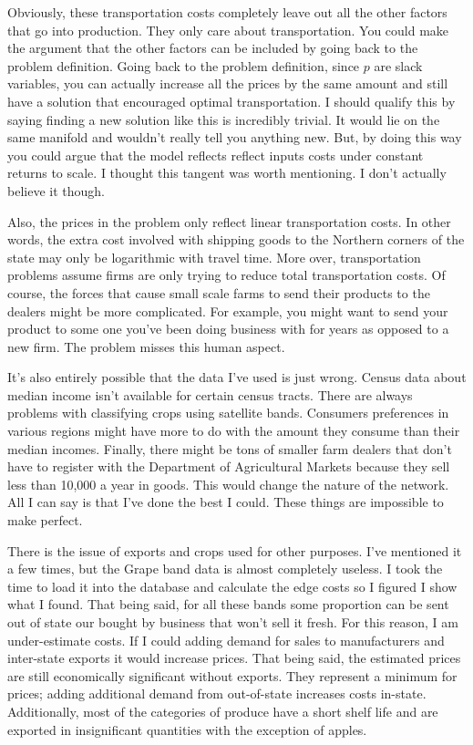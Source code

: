 \documentclass{report}
\begin{document}
Obviously, these transportation costs completely leave out all the other factors that go into production. They only care about transportation. You could make the argument that the other factors can be included by going back to the problem definition. Going back to the problem definition, since $p$ are slack variables, you can actually increase all the prices by the same amount and still have a solution that encouraged optimal transportation. I should qualify this by saying finding a new solution like this is incredibly trivial. It would lie on the same manifold and wouldn't really tell you anything new. But, by doing this way you could argue that the model reflects reflect inputs costs under constant returns to scale. I thought this tangent was worth mentioning. I don't actually believe it though.

Also, the prices in the problem only reflect linear transportation costs. In other words, the extra cost involved with shipping goods to the Northern corners of the state may only be logarithmic with travel time. More over, transportation problems assume firms are only trying to reduce total transportation costs. Of course, the forces that cause small scale farms to send their products to the dealers might be more complicated. For example, you might want to send your product to some one you've been doing business with for years as opposed to a new firm. The problem misses this human aspect.

It's also entirely possible that the data I've used is just wrong. Census data about median income isn't available for certain census tracts. There are always problems with classifying crops using satellite bands. Consumers preferences in various regions might have more to do with the amount they consume than their median incomes. Finally, there might be tons of smaller farm dealers that don't have to register with the Department of Agricultural Markets because they sell less than 10,000 a year in goods. This would change the nature of the network. All I can say is that I've done the best I could. These things are impossible to make perfect.

There is the issue of exports and crops used for other purposes. I've mentioned it a few times, but the Grape band data is almost completely useless. I took the time to load it into the database and calculate the edge costs so I figured I show what I found. That being said, for all these bands some proportion can be sent out of state our bought by business that won't sell it fresh. For this reason, I am under-estimate costs. If I could adding demand for sales to manufacturers and inter-state exports it would increase prices. That being said, the estimated prices are still economically significant without exports. They represent a minimum for prices; adding additional demand from out-of-state increases costs in-state. Additionally, most of the categories of produce have a short shelf life and are exported in insignificant quantities with the exception of apples.
\end{document}
